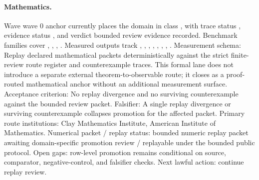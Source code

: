 \paragraph{Mathematics.}
Wave wave 0 anchor currently places the domain in class , with trace status , evidence status , and verdict bounded review evidence recorded.
Benchmark families cover , \allowbreak {}, \allowbreak {}, \allowbreak {}.
Measured outputs track , \allowbreak {}, \allowbreak {}, \allowbreak {}, \allowbreak {}, \allowbreak {}, \allowbreak {}, \allowbreak {}.
Measurement schema: Replay declared mathematical packets deterministically against the strict finite-review route register and counterexample traces.
This formal lane does not introduce a separate external theorem-to-observable route; it closes as a proof-routed mathematical anchor without an additional measurement surface.
Acceptance criterion: No replay divergence and no surviving counterexample against the bounded review packet.
Falsifier: A single replay divergence or surviving counterexample collapses promotion for the affected packet.
Primary route institutions: Clay Mathematics Institute, \allowbreak American Institute of Mathematics.
Numerical packet / replay status: bounded numeric replay packet awaiting domain-specific promotion review / replayable under the bounded public protocol.
Open gaps: row-level promotion remains conditional on source, comparator, negative-control, and falsifier checks.
Next lawful action: continue replay review.

